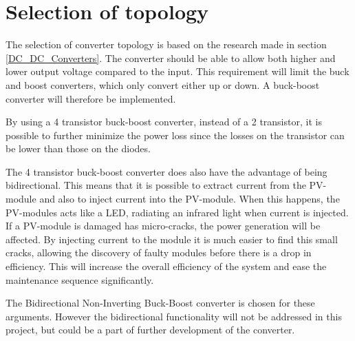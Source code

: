 \section{Selection of topology}
The selection of converter topology is based on the research made in section \ref{DC_DC_Converters}. The converter should be able to allow both higher and lower output voltage compared to the input. This requirement will limit the buck and boost converters, which only convert either up or down. A buck-boost converter will therefore be implemented.

By using a 4 transistor buck-boost converter, instead of a 2 transistor, it is possible to further minimize the power loss since the losses on the transistor can be lower than those on the diodes. 

The 4 transistor buck-boost converter does also have the advantage of being bidirectional. This means that it is possible to extract current from the PV-module and also to inject current into the PV-module. When this happens, the PV-modules acts like a LED, radiating an infrared light when current is injected. If a PV-module is damaged has micro-cracks, the power generation will be affected. By injecting current to the module it is much easier to find this small cracks, allowing the discovery of faulty modules before there is a drop in efficiency. This will increase the overall efficiency of the system and ease the maintenance sequence significantly. 

The Bidirectional Non-Inverting Buck-Boost converter is chosen for these arguments. However the bidirectional functionality will not be addressed in this project, but could be a part of further development of the converter. 






 